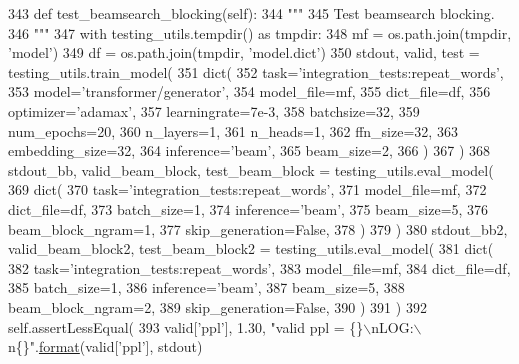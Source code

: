 \begin{DoxyCode}
343     \textcolor{keyword}{def }test\_beamsearch\_blocking(self):
344         \textcolor{stringliteral}{"""}
345 \textcolor{stringliteral}{        Test beamsearch blocking.}
346 \textcolor{stringliteral}{        """}
347         with testing\_utils.tempdir() \textcolor{keyword}{as} tmpdir:
348             mf = os.path.join(tmpdir, \textcolor{stringliteral}{'model'})
349             df = os.path.join(tmpdir, \textcolor{stringliteral}{'model.dict'})
350             stdout, valid, test = testing\_utils.train\_model(
351                 dict(
352                     task=\textcolor{stringliteral}{'integration\_tests:repeat\_words'},
353                     model=\textcolor{stringliteral}{'transformer/generator'},
354                     model\_file=mf,
355                     dict\_file=df,
356                     optimizer=\textcolor{stringliteral}{'adamax'},
357                     learningrate=7e-3,
358                     batchsize=32,
359                     num\_epochs=20,
360                     n\_layers=1,
361                     n\_heads=1,
362                     ffn\_size=32,
363                     embedding\_size=32,
364                     inference=\textcolor{stringliteral}{'beam'},
365                     beam\_size=2,
366                 )
367             )
368             stdout\_bb, valid\_beam\_block, test\_beam\_block = testing\_utils.eval\_model(
369                 dict(
370                     task=\textcolor{stringliteral}{'integration\_tests:repeat\_words'},
371                     model\_file=mf,
372                     dict\_file=df,
373                     batch\_size=1,
374                     inference=\textcolor{stringliteral}{'beam'},
375                     beam\_size=5,
376                     beam\_block\_ngram=1,
377                     skip\_generation=\textcolor{keyword}{False},
378                 )
379             )
380             stdout\_bb2, valid\_beam\_block2, test\_beam\_block2 = testing\_utils.eval\_model(
381                 dict(
382                     task=\textcolor{stringliteral}{'integration\_tests:repeat\_words'},
383                     model\_file=mf,
384                     dict\_file=df,
385                     batch\_size=1,
386                     inference=\textcolor{stringliteral}{'beam'},
387                     beam\_size=5,
388                     beam\_block\_ngram=2,
389                     skip\_generation=\textcolor{keyword}{False},
390                 )
391             )
392         self.assertLessEqual(
393             valid[\textcolor{stringliteral}{'ppl'}], 1.30, \textcolor{stringliteral}{"valid ppl = \{\}\(\backslash\)nLOG:\(\backslash\)n\{\}"}.\hyperlink{namespaceparlai_1_1chat__service_1_1services_1_1messenger_1_1shared__utils_a32e2e2022b824fbaf80c747160b52a76}{format}(valid[\textcolor{stringliteral}{'ppl'}], stdout)

\end{DoxyCode}
